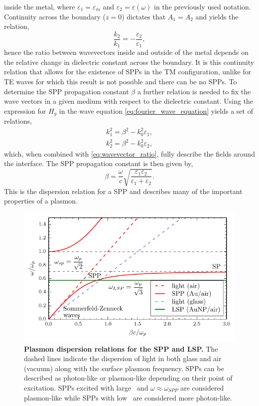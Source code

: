 \documentclass{article}
\begin{document}
inside the metal, where $\varepsilon_1=\varepsilon_m$ and $\varepsilon_2=\varepsilon(\omega)$ in the previously used notation. Continuity across the boundary ($z=0$) dictates that $A_1=A_2$ and yields the relation,
\begin{equation}
\frac{k_2}{k_1} = -\frac{\varepsilon_2}{\varepsilon_1},
\label{eq:wavevector_ratio}
\end{equation}
hence the ratio between wavevectors inside and outside of the metal depends on the relative change in dielectric constant across the boundary. It is this continuity relation that allows for the existence of SPPs in the TM configuration, unlike for TE waves for which this result is not possible and there can be no SPPs. To determine the SPP propagation constant $\beta$ a further relation is needed to fix the wave vectors in a given medium with respect to the dielectric constant. Using the expression for $H_y$ in the wave equation \eqref{eq:fourier_wave_equation} yields a set of relations,
\begin{subequations}
\begin{align}
k_1^2 = \beta^2 - k_0^2\varepsilon_1,\\
k_2^2 = \beta^2 - k_0^2\varepsilon_2,
\end{align}
\end{subequations}
which, when combined with \eqref{eq:wavevector_ratio}, fully describe the fields around the interface. The SPP propagation constant is then given by,
\begin{equation}
\beta = \frac{\omega}{c}\sqrt{\frac{\varepsilon_1 \varepsilon_2}{\varepsilon_1 + \varepsilon_2}}.
\label{eq:spp_dispersion}
\end{equation}
This is the dispersion relation for a SPP and describes many of the important properties of a plasmon.

\begin{figure}[bt]
\centering
\includegraphics{figures/spp_dispersion}
\caption[Plasmon dispersion relations for the SPP and LSP]{\textbf{Plasmon dispersion relations for the SPP and LSP.} The dashed lines indicate the dispersion of light in both glass and air (vacuum) along with the surface plasmon frequency. SPPs can be described as photon-like or plasmon-like depending on their point of excitation. SPPs excited with large \wvm\ and $\omega\approx\omega_{SPP}$ are considered plasmon-like while SPPs with low \wvm\ are considered more photon-like.}
\label{fig:spp_dispersion}
\end{figure}
\end{document}
